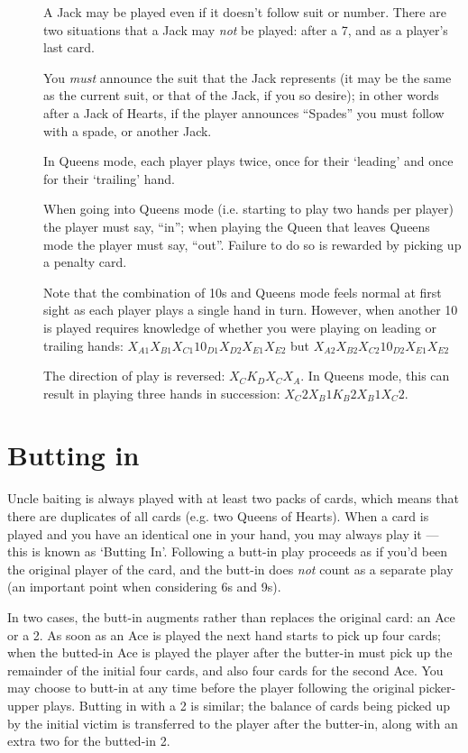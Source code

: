 \documentclass[12pt]{article}
\begin{document}
\begin{description}
  \item[]
    A Jack may be played even if it doesn't follow suit or number.  There are two situations
    that a Jack may \emph{not} be played:  after a 7, and as a player's last card.

    You \emph{must} announce the suit that the Jack represents (it may be the same as the
    current suit, or that of the Jack, if you so desire);  in other words after a Jack of
    Hearts, if the player announces ``Spades'' you must follow with a spade, or another Jack.

  \item[]
    In Queens mode, each player plays twice, once for their `leading' and once for their
    `trailing' hand.

    When going into Queens mode (i.e. starting to play two hands per player) the player must say, ``in''; when playing
    the Queen that leaves Queens mode the player must say, ``out''.  Failure to do so is rewarded by picking up a
    penalty card.

    Note that the combination of 10s and Queens mode feels normal at first sight as each player plays a single hand in
    turn.  However, when another 10 is played requires knowledge of whether you were playing on leading or trailing
    hands: $X_{A1} X_{B1} X_{C1} 10_{D1} X_{D2} X_{E1} X_{E2}$ but $X_{A2} X_{B2} X_{C2} 10_{D2} X_{E1} X_{E2}$

  \item[]
    The direction of play is reversed: $X_C K_D X_C X_A$.  In Queens mode, this can result in playing
    three hands in succession: $X_C2 X_B1 K_B2 X_B1 X_C2$.

\end{description}

\section{Butting in}
\label{buttingIn}

Uncle baiting is always played with at least two packs of cards, which means that there
are duplicates of all cards (e.g. two Queens of Hearts).  When a card is played and you
have an identical one in your hand, you may always play it --- this is known as `Butting In'.
Following a butt-in play proceeds as if you'd been the original player of the card, and
the butt-in does \emph{not} count as a separate play (an important point when considering
6s and 9s).

In two cases, the butt-in augments rather than replaces the original card:
an Ace or a 2.  As soon as an Ace is played the next hand starts to pick up
four cards;  when the butted-in Ace is played the player after the butter-in
must pick up the remainder of the initial four cards, and also four cards for
the second Ace.  You may choose to butt-in at any time before the player following
the original picker-upper plays.   Butting in with a 2 is similar;  the balance
of cards being picked up by the initial victim is transferred to the player
after the butter-in, along with an extra two for the butted-in 2.
\end{document}

